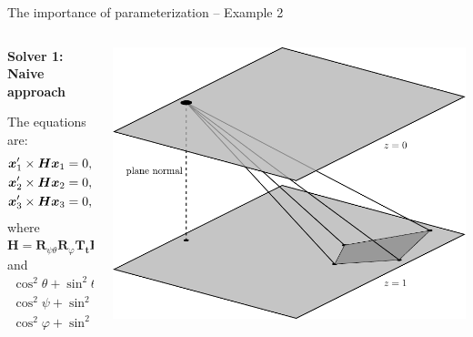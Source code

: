 \documentclass[aspectratio=169]{beamer}
\renewcommand{\phi}{\varphi}
\newcommand{\mat}[1]{\bm{#1}}
\newcommand{\T}{T}
\begin{document}
\begin{frame}[t]{The importance of parameterization -- Example 2}
\begin{columns}
    \begin{column}{0.5\textwidth}
        \begin{minipage}[t][\textheight][t]{\textwidth}
        \theimportanceTwoHeight
        \textbf{Solver 1: Naive approach}

        The equations are:
        \[
        \begin{aligned}
            \mat{x}_1'\times \mat{Hx}_1 &= 0, &\quad \text{{\tiny (keep\,2\,eqs.)}} \\
            \mat{x}_2'\times \mat{Hx}_2 &= 0, &\quad \text{{\tiny (keep\,2\,eqs.)}} \\
            \mat{x}_3'\times \mat{Hx}_3 &= 0, &\quad \text{{\tiny (keep\,1\,eq.)}}
        \end{aligned}
        \]
        where
        $\mat{H} = \mat{R}_{\psi\theta}\mat{R}_{\phi}\mat{T}_{\mat{t}}\mat{R}_{\psi\theta}^{\T}$
        and
        \[
        \begin{aligned}
            \cos^2{\theta} + \sin^2{\theta} &= 0, \\
            \cos^2{\psi} + \sin^2{\psi} &= 0, \\
            \cos^2{\phi} + \sin^2{\phi} &= 0\;.
        \end{aligned}
        \]
        \end{minipage}
    \end{column}%
    \begin{column}{0.5\textwidth}
        \centering
        \includegraphics[width=\linewidth]{../lecture_notes/images/prob_geom1.pdf}
    \end{column}%
\end{columns}
\end{frame}
\end{document}
